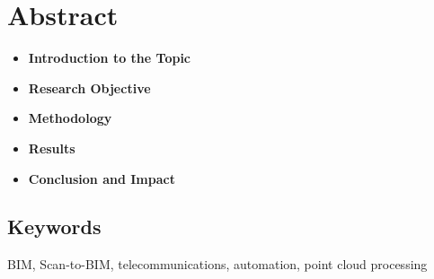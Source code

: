 \chapter*{Abstract}

\begin{itemize}
    \item \textbf{Introduction to the Topic}  

    \item \textbf{Research Objective}  

    \item \textbf{Methodology}  

    \item \textbf{Results}  

    \item \textbf{Conclusion and Impact}  
\end{itemize}


\section*{Keywords}
BIM, Scan-to-BIM, telecommunications, automation, point cloud processing